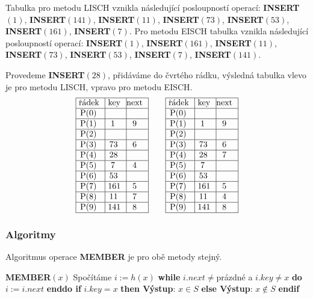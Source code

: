 \documentclass[a4paper,12pt]{article}
\begin{document}
Tabulka pro metodu LISCH vznikla následující posloupností 
operací:\newline 
{\bf INSERT$(1)$}, {\bf INSERT$(141)$}, {\bf INSERT$(11)$}, {\bf INSERT$
(73)$}, 
{\bf INSERT$(53)$},\newline 
{\bf INSERT$(161)$}, {\bf INSERT$(7)$}.\newline 
Pro metodu EISCH tabulka vznikla následující posloupností 
operací:\newline 
{\bf INSERT$(1)$}, {\bf INSERT$(161)$}, {\bf INSERT$(11)$}, {\bf INSERT$
(73)$}, 
{\bf INSERT$(53)$}, {\bf INSERT$(7)$}, {\bf INSERT$(141)$}. 

Provedeme {\bf INSERT$(28)$}, přidáváme do čvrtého rádku, vý\-sled\-ná tabulka vlevo je pro meto\-du 
LISCH, vpravo pro metodu EISCH.
$$\vbox {\hbox{\vtop{\offinterlineskip\halign{\strut\vrule\ # & \vrule\ # & \vrule\hfil# \hfil\vrule\cr\noalign{\hrule}řádek & key & next \hfil\cr\noalign{\hrule}P(0) & &\hfill \cr\noalign{\hrule}P(1) & 1 & 9 \cr\noalign{\hrule}P(2) & &\hfill \cr\noalign{\hrule}P(3) & 73 & 6 \cr\noalign{\hrule}P(4) & 28 &\hfill \cr\noalign{\hrule}P(5) & 7 & 4 \cr\noalign{\hrule}P(6) & 53 &\hfill \cr\noalign{\hrule}P(7) & 161 & 5 \cr\noalign{\hrule}P(8) & 11 & 7 \cr\noalign{\hrule}P(9) & 141 & 8 \cr\noalign{\hrule}}}\qquad\vtop{\offinterlineskip\halign {\strut\vrule\ # & \vrule\ # & \vrule \hfil # \hfil \vrule\cr\noalign{\hrule}řádek & key & next \hfil \cr\noalign{\hrule}P(0) & &\hfill \cr\noalign{\hrule}P(1) & 1 & 9 \cr\noalign{\hrule}P(2) & &\hfill \cr\noalign{\hrule}P(3) & 73 & 6 \cr\noalign{\hrule}P(4) & 28 & 7 \cr\noalign{\hrule}P(5) & 7 & \hfill \cr\noalign{\hrule}P(6) & 53 & \hfill \cr\noalign{\hrule}P(7) & 161 & 5 \cr\noalign{\hrule}P(8) & 11 & 4  \cr\noalign{\hrule}P(9) & 141 & 8 \cr\noalign{\hrule}}}}}$$

\subsubsection{Algoritmy}

Algoritmus operace {\bf MEMBER} je pro obě metody stejný.


{\bf MEMBER$(x)$}\newline 
Spočítáme $i:=h(x)$\newline 
{\bf while} $i.next\ne$prázdné a $i.key\ne x$ {\bf do} $i:=i.
next$ {\bf enddo \newline 
if} $i.key=x$ {\bf then Výstup}: $x\in S$ {\bf else Výstup}: $
x\notin S$ {\bf endif}
\end{document}
